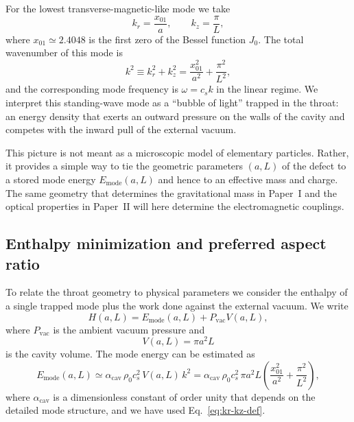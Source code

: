 \documentclass[11pt]{article}
\newcommand{\acav}{\alpha_{\mathrm{cav}}}
\begin{document}
For the lowest transverse-magnetic-like mode we take
\begin{equation}
k_r = \frac{x_{01}}{a},\qquad
k_z = \frac{\pi}{L},
\label{eq:kr-kz-def}
\end{equation}
where $x_{01}\simeq 2.4048$ is the first zero of the Bessel function $J_0$.  The total wavenumber of this mode is
\begin{equation}
k^2 \equiv k_r^2 + k_z^2
= \frac{x_{01}^2}{a^2} + \frac{\pi^2}{L^2},
\end{equation}
and the corresponding mode frequency is $\omega = c_s k$ in the linear regime.  We interpret this standing-wave mode as a ``bubble of light'' trapped in the throat: an energy density that exerts an outward pressure on the walls of the cavity and competes with the inward pull of the external vacuum.

This picture is not meant as a microscopic model of elementary particles.  Rather, it provides a simple way to tie the geometric parameters $(a,L)$ of the defect to a stored mode energy $E_{\mathrm{mode}}(a,L)$ and hence to an effective mass and charge.  The same geometry that determines the gravitational mass in Paper~I and the optical properties in Paper~II will here determine the electromagnetic couplings.

\subsection{Enthalpy minimization and preferred aspect ratio}

To relate the throat geometry to physical parameters we consider the enthalpy of a single trapped mode plus the work done against the external vacuum.  We write
\begin{equation}
H(a,L) = E_{\mathrm{mode}}(a,L) + P_{\mathrm{vac}} V(a,L),
\label{eq:enthalpy-def}
\end{equation}
where $P_{\mathrm{vac}}$ is the ambient vacuum pressure and
\begin{equation}
V(a,L) = \pi a^2 L
\end{equation}
is the cavity volume.  The mode energy can be estimated as
\begin{equation}
E_{\mathrm{mode}}(a,L)
\simeq \acav\,\rho_0 c_s^2\,V(a,L)\,k^2
= \acav\,\rho_0 c_s^2\,\pi a^2 L
\left(\frac{x_{01}^2}{a^2} + \frac{\pi^2}{L^2}\right),
\label{eq:Emode-estimate}
\end{equation}
where $\acav$ is a dimensionless constant of order unity that depends on the detailed mode structure, and we have used Eq.~\eqref{eq:kr-kz-def}.
\end{document}
